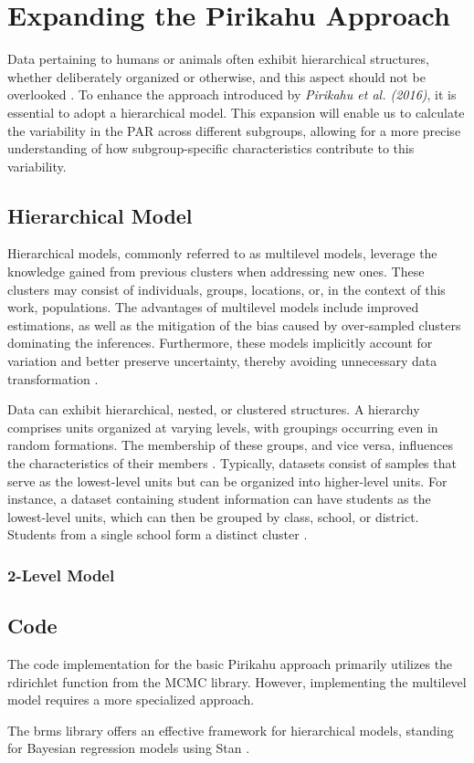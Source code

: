 \chapter{Expanding the Pirikahu Approach} \label{sec:Expanding}

Data pertaining to humans or animals often exhibit hierarchical structures, whether deliberately organized or otherwise, and this aspect should not be overlooked \cite{Goldstein2010MultilevelSM}. To enhance the approach introduced by \textit{Pirikahu et al. (2016)}, it is essential to adopt a hierarchical model. This expansion will enable us to calculate the variability in the PAR across different subgroups, allowing for a more precise understanding of how subgroup-specific characteristics contribute to this variability.

\section{Hierarchical Model} \label{hierarchicalExpansion}
Hierarchical models, commonly referred to as multilevel models, leverage the knowledge gained from previous clusters when addressing new ones. These clusters may consist of individuals, groups, locations, or, in the context of this work, populations. The advantages of multilevel models include improved estimations, as well as the mitigation of the bias caused by over-sampled clusters dominating the inferences. Furthermore, these models implicitly account for variation and better preserve uncertainty, thereby avoiding unnecessary data transformation \cite{Mcelreath2015StatisticalRA}.

Data can exhibit hierarchical, nested, or clustered structures. A hierarchy comprises units organized at varying levels, with groupings occurring even in random formations. The membership of these groups, and vice versa, influences the characteristics of their members \cite{Goldstein2010MultilevelSM}. Typically, datasets consist of samples that serve as the lowest-level units but can be organized into higher-level units. For instance, a dataset containing student information can have students as the lowest-level units, which can then be grouped by class, school, or district. Students from a single school form a distinct cluster \cite{HierarchicalModelsForSurveyData}.

\subsection{2-Level Model} \label{2levelModel}

\section{Code} \label{HCode}
The code implementation for the basic Pirikahu approach primarily utilizes the rdirichlet function from the MCMC library. However, implementing the multilevel model requires a more specialized approach. 

The brms library offers an effective framework for hierarchical models, standing for Bayesian regression models using Stan \cite{brms}.